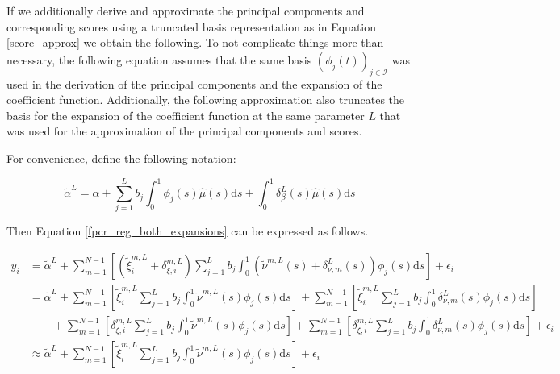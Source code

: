 \documentclass[11pt,twoside,a4paper]{article}
\begin{document}
	If we additionally derive and approximate the principal components and corresponding scores using a truncated basis representation as in Equation \ref{score_approx} we obtain the following. To not complicate things more than necessary, the following equation assumes that the same basis $\left(\phi_j(t)\right)_{j \in \mathcal{I}}$ was used in the derivation of the principal components and the expansion of the coefficient function. Additionally, the following approximation also truncates the basis for the expansion of the coefficient function at the same parameter $L$ that was used for the approximation of the principal components and scores.
	
	For convenience, define the following notation:
	
	\begin{equation}
		\tilde{\alpha}^L = \alpha + \sum_{j = 1}^{L} b_j \int_{0}^{1} \phi_j(s) \hat{\mu}(s) \mathrm{d}s + \int_{0}^{1} \delta_{\beta}^{L}(s) \hat{\mu}(s) \mathrm{d}s
	\end{equation}
	
	Then Equation \ref{fpcr_reg_both_expansions} can be expressed as follows.
	
	\begin{equation}
		\begin{split}
			y_i & = \tilde{\alpha}^L
			+ \sum_{m = 1}^{N-1} \left[ \left(\tilde{\xi}^{m,L}_{i} + \delta_{\xi, i}^{m, L} \right) \sum_{j = 1}^{L} b_j \int_{0}^{1} \left(\tilde{\nu}^{m,L}(s) + \delta_{\nu, m}^L(s) \right) \phi_j(s) \mathrm{d}s \right] 
			+ \epsilon_i \\
			& = \tilde{\alpha}^L
			+ \sum_{m = 1}^{N-1} \left[ \tilde{\xi}^{m,L}_{i} \sum_{j = 1}^{L} b_j \int_{0}^{1} \tilde{\nu}^{m,L}(s) \phi_j(s) \mathrm{d}s \right] 
			+ \sum_{m = 1}^{N-1} \left[ \tilde{\xi}^{m,L}_{i} \sum_{j = 1}^{L} b_j \int_{0}^{1} \delta_{\nu, m}^L(s) \phi_j(s) \mathrm{d}s \right] \\
			& \quad \quad + \sum_{m = 1}^{N-1} \left[ \delta_{\xi, i}^{m, L} \sum_{j = 1}^{L} b_j \int_{0}^{1} \tilde{\nu}^{m,L}(s) \phi_j(s) \mathrm{d}s \right] 
			+ \sum_{m = 1}^{N-1} \left[ \delta_{\xi, i}^{m, L} \sum_{j = 1}^{L} b_j \int_{0}^{1} \delta_{\nu, m}^L(s) \phi_j(s) \mathrm{d}s \right]
			+ \epsilon_i \\
			& \approx \tilde{\alpha}^L
			+ \sum_{m = 1}^{N-1} \left[ \tilde{\xi}^{m,L}_{i} \sum_{j = 1}^{L} b_j \int_{0}^{1} \tilde{\nu}^{m,L}(s) \phi_j(s) \mathrm{d}s \right] + \epsilon_i
		\end{split}
	\end{equation}
\end{document}
